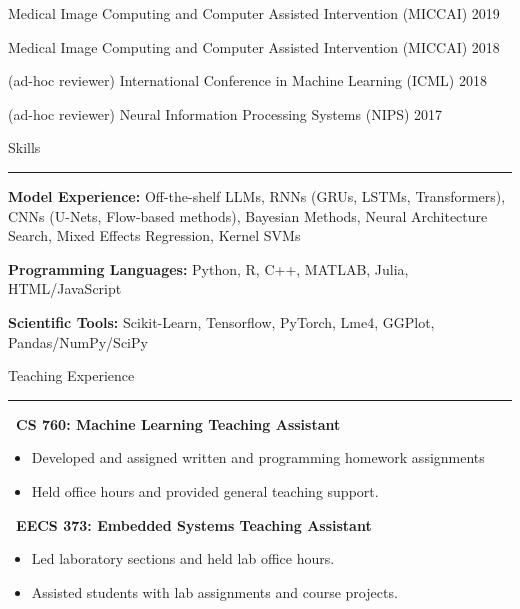 \documentclass[]{article}
\begin{document}
\noindent Medical Image Computing and Computer Assisted Intervention (MICCAI) \hfill 2019

\noindent Medical Image Computing and Computer Assisted Intervention (MICCAI) \hfill 2018

\noindent (ad-hoc reviewer) International Conference in Machine Learning (ICML) \hfill 2018

\noindent (ad-hoc reviewer) Neural Information Processing Systems (NIPS) \hfill 2017
\fi

\vspace{10pt}
{\LARGE Skills}
\vspace{5pt}
\hrule
\vspace{10pt}

\noindent \textbf{Model Experience:} Off-the-shelf LLMs, RNNs (GRUs, LSTMs, Transformers), CNNs (U-Nets, Flow-based methods), Bayesian Methods, Neural Architecture Search, Mixed Effects Regression,
Kernel SVMs

\noindent \textbf{Programming Languages:} Python, R, C++, MATLAB, Julia, HTML/JavaScript

\noindent \textbf{Scientific Tools:} Scikit-Learn, Tensorflow, PyTorch, Lme4, GGPlot, Pandas/NumPy/SciPy


\iffalse
\vspace{5pt}
{\LARGE Teaching Experience}
\vspace{3pt}
\hrule
\vspace{5pt}

 \newline
	{\bf \ CS 760: Machine Learning Teaching Assistant}
	\begin{itemize}[label={$\bullet$}]
		\item Developed and assigned written and programming homework assignments
		\item Held office hours and provided general teaching support.
	\end{itemize} 

 \newline
	{\bf \ EECS 373: Embedded Systems Teaching Assistant}
	\begin{itemize}[label={$\bullet$}]
		\item Led laboratory sections and held lab office hours.
		\item Assisted students with lab assignments and course projects.
	\end{itemize}
\end{document}
